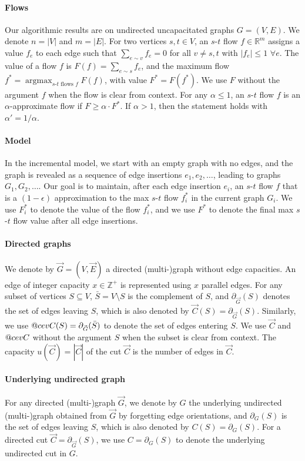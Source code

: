 \documentclass[11pt,a4paper]{article}
\makeatletter
\newcommand{\argmax}{\operatorname*{argmax}}
\newcommand{\eps}{\epsilon}
\newcommand{\R}{\mathbb{R}}
\DeclareRobustCommand{\cev}[1]{{\mathpalette\do@cev{#1}}}
\newcommand{\do@cev}[2]{\vbox{\offinterlineskip
    \sbox\z@{$\m@th#1 x$}\ialign{##\cr
      \hidewidth\reflectbox{$\m@th#1\vec{}\mkern4mu$}\hidewidth\cr
      \noalign{\kern-\ht\z@}
      $\m@th#1#2$\cr
    }}}
\makeatother
\begin{document}
\paragraph*{Flows}
Our algorithmic results are on undirected uncapacitated graphs $G=(V,E)$. We denote $n = |V|$ and $m = |E|$.
For two vertices $s, t \in V$, an $s$-$t$ flow $f \in \R^m$ assigns a value $f_e$ to each edge such that $\sum_{e \sim v} f_e = 0$ for all $v \neq s, t$ with $|f_e| \le 1$ $\forall e$. The value of a flow $f$ is $F(f) = \sum_{e \sim s} f_e$, and the maximum flow $f^* = \argmax_{\text{$s$-$t$ flows $f$}} F(f)$, with value $F^* = F(f^*)$. We use $F$ without the argument $f$ when the flow is clear from context. For any $\alpha \le 1$, an $s$-$t$ flow $f$ is an $\alpha$-approximate flow if $F \ge \alpha \cdot F^*$. If $\alpha > 1$, then the statement holds with $\alpha' = 1/\alpha$.

\paragraph*{Model}
In the incremental model, we start with an empty graph with no edges, and the graph is revealed as a sequence of edge insertions $e_1, e_2, \ldots$, leading to graphs $G_1, G_2, \ldots$. Our goal is to maintain, after each edge insertion $e_i$, an $s$-$t$ flow $f$ that is a $(1-\eps)$ approximation to the max $s$-$t$ flow $f^*_i$ in the current graph $G_i$. We use $F_i^*$ to denote the value of the flow $f_i^*$, and we use $F^*$ to denote the final max $s$-$t$ flow value after all edge insertions.

\paragraph*{Directed graphs}
We denote by $\vec{G} = (V, \vec{E})$ a directed (multi-)graph without edge capacities. An edge of integer capacity $x \in \mathbb Z^{+}$ is represented using $x$ parallel edges. For any subset of vertices $S \subseteq V$, $\bar{S} = V \setminus S$ is the complement of $S$, and $\partial_{\vec{G}}(S)$ denotes the set of edges leaving $S$, which is also denoted by $\vec{C}(S) = \partial_{\vec{G}}(S)$. Similarly, we use $\cev{C}(S) = \partial_{\vec{G}}(\bar{S})$ to denote the set of edges entering $S$. We use $\vec{C}$ and $\cev{C}$ without the argument $S$ when the subset is clear from context. The capacity $u(\vec{C}) = |\vec{C}|$ of the cut $\vec{C}$ is the number of edges in $\vec{C}$.

\paragraph*{Underlying undirected graph}
For any directed (multi-)graph $\vec{G}$, we denote by $G$ the underlying undirected (multi-)graph obtained from $\vec{G}$ by forgetting edge orientations, and $\partial_G(S)$ is the set of edges leaving $S$, which is also denoted by $C(S) = \partial_G(S)$.
For a directed cut $\vec{C} = \partial_{\vec{G}}(S)$, we use $C = \partial_G(S)$ to denote the underlying undirected cut in $G$.
\end{document}

